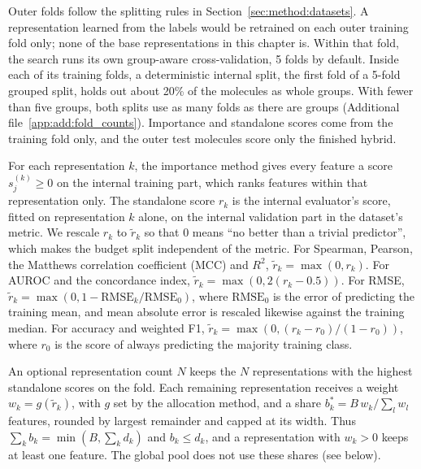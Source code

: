 Outer folds follow the splitting rules in Section~\ref{sec:method:datasets}. A representation learned from the labels would be retrained on each outer training fold only; none of the base representations in this chapter is. Within that fold, the search runs its own group-aware cross-validation, 5 folds by default. Inside each of its training folds, a deterministic internal split, the first fold of a 5-fold grouped split, holds out about 20\% of the molecules as whole groups. With fewer than five groups, both splits use as many folds as there are groups (Additional file~\ref{app:add:fold_counts}). Importance and standalone scores come from the training fold only, and the outer test molecules score only the finished hybrid.

For each representation $k$, the importance method gives every feature a score $s^{(k)}_j \ge 0$ on the internal training part, which ranks features within that representation only. The standalone score $r_k$ is the internal evaluator's score, fitted on representation $k$ alone, on the internal validation part in the dataset's metric. We rescale $r_k$ to $\tilde r_k$ so that 0 means ``no better than a trivial predictor'', which makes the budget split independent of the metric. For Spearman, Pearson, the Matthews correlation coefficient (MCC) and $R^2$, $\tilde r_k = \max(0, r_k)$. For AUROC and the concordance index, $\tilde r_k = \max(0, 2(r_k - 0.5))$. For RMSE, $\tilde r_k = \max(0, 1 - \mathrm{RMSE}_k/\mathrm{RMSE}_0)$, where $\mathrm{RMSE}_0$ is the error of predicting the training mean, and mean absolute error is rescaled likewise against the training median. For accuracy and weighted F1, $\tilde r_k = \max(0, (r_k - r_0)/(1 - r_0))$, where $r_0$ is the score of always predicting the majority training class.

An optional representation count $N$ keeps the $N$ representations with the highest standalone scores on the fold. Each remaining representation receives a weight $w_k = g(\tilde r_k)$, with $g$ set by the allocation method, and a share $b^*_k = B\, w_k / \sum_l w_l$ features, rounded by largest remainder and capped at its width. Thus $\sum_k b_k = \min(B, \sum_k d_k)$ and $b_k \le d_k$, and a representation with $w_k > 0$ keeps at least one feature. The global pool does not use these shares (see below).

